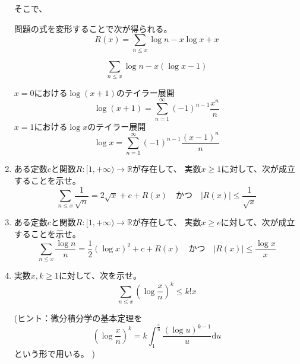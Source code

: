 \documentclass[12pt,b5paper]{ltjsarticle}
\begin{document}
\begin{enumerate}


      そこで、



      問題の式を変形することで次が得られる。
      \begin{equation}
       R(x) =
       \sum_{n\leq x}\log{n} - x\log{x} +x
      \end{equation}


      \begin{equation}
       \sum_{n\leq x}\log{n} - x(\log{x} -1)
      \end{equation}

      $x=0$における$\log{(x+1)}$のテイラー展開
      \begin{equation}
       \log{(x+1)} = \sum_{n=1}^{\infty}(-1)^{n-1}\frac{x^n}{n}
      \end{equation}
      $x=1$における$\log{x}$のテイラー展開
      \begin{equation}
       \log{x} = \sum_{n=1}^{\infty}(-1)^{n-1}\frac{(x-1)^n}{n}
      \end{equation}

      \hrulefill
 \item
      ある定数$c$と関数$R:[1,+\infty) \to \mathbb{R}$が存在して、
      実数$x\geq 1$に対して、次が成立することを示せ。
      \begin{equation}
       \sum_{n\leq x} \frac{1}{\sqrt{n}}
        = 2\sqrt{x}+c +R(x)
        \quad \text{かつ}\quad
        \lvert R(x) \rvert \leq \frac{1}{\sqrt{x}}
      \end{equation}


      \hrulefill
 \item
      ある定数$c$と関数$R:[1,+\infty) \to \mathbb{R}$が存在して、
      実数$x\geq e$に対して、次が成立することを示せ。
      \begin{equation}
       \sum_{n\leq x} \frac{\log{n}}{n} = \frac{1}{2}(\log{x})^2 +c+R(x)
        \quad \text{かつ}\quad
        \lvert R(x) \rvert \leq \frac{\log{x}}{x}
      \end{equation}


      \hrulefill
 \item
      実数$x,k\geq 1$に対して、次を示せ。
      \begin{equation}
       \sum_{n\leq x}\left( \log{\frac{x}{n}} \right)^k \leq k! x
      \end{equation}

      (ヒント：微分積分学の基本定理を
      \begin{equation}
       \left( \log{\frac{x}{n}} \right)^{k}
        = k\int_{1}^{\frac{x}{n}} \frac{(\log{u})^{k-1}}{u} \mathrm{d}u
      \end{equation}
      という形で用いる。
      )


\end{enumerate}


\hrulefill
\end{document}
